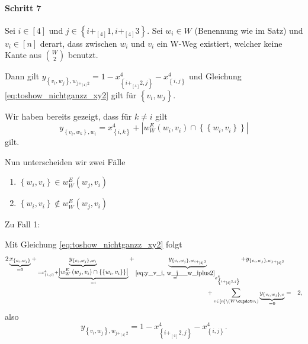 \documentclass[10p,a4paper,BCOR = 12mm, DIV=15]{scrbook}
\begin{document}
{\begin{bew}
\paragraph{Schritt 7} Sei $i \in \left[4\right]$ und $j \in \left\{i +_{\left[4\right]} 1, i +_{\left[4\right]} 3\right\}$. Sei $w_i \in W$ (Benennung wie im Satz) und $v_i \in \left[n\right]$ derart, dass zwischen $w_i$ und $v_i$ ein W-Weg existiert, welcher keine Kante aus ${W \choose 2}$ benutzt.

Dann gilt $y_{\left\{v_i, w_j\right\}, w_{j +_{\left[4\right]} 2}} = 1 - x^{4}_{\left\{i+_{\left[4\right]} 2, j\right\}} - x^{4}_{\left\{i, j\right\}}$ und Gleichung \eqref{eq:toshow_nichtganzz_xy2} gilt für $\left\{v_i, w_j\right\}$.

Wir haben bereits gezeigt, dass für $k \neq i$ gilt
\begin{displaymath}
y_{\left\{v_i, w_k\right\}, w_i} = x^{4}_{\left\{i, k\right\}} + \left|w_W^E\left(w_i, v_i\right) \cap \left\{\left\{w_i, v_i\right\}\right\}\right|
\end{displaymath}
gilt.

Nun unterscheiden wir zwei Fälle
\begin{enumerate}
\item $\left\{w_i, v_i\right\} \in w_W^E\left(w_j, v_i\right)$
\item $\left\{w_i, v_i\right\} \notin w_W^E\left(w_j, v_i\right)$
\end{enumerate}

Zu Fall 1:

Mit Gleichung \eqref{eq:toshow_nichtganzz_xy2} folgt
\begin{eqnarray*}
2 \underbrace{x_{\left\{v_i, w_j\right\}}}_{= 0} + \underbrace{y_{\left\{v_i, w_j\right\}, w_i}}_{= x^{4}_{\left\{i, j\right\}} + \underbrace{\left|w_W^E\left(w_j, v_i\right) \cap \left\{\left\{w_i, v_i\right\}\right\}\right|}_{=1}} + \underbrace{y_{\left\{v_i, w_j\right\}, w_{i +_{\left[4\right]} 2}}}_{\stackrel{\eqref{eq:y_v_i, w_j__w_iplus2}}{=} x^{4}_{\left\{i+_{\left[4\right]} 2, j\right\}}} + y_{\left\{v_i, w_j\right\}, w_{j +_{\left[4\right]} 2}} & & \\
+ \sum_{v \in \left[n\right] \backslash \left(W \cupdot v_i\right)} \underbrace{y_{\left\{v_i, w_j\right\}, v}}_{= 0} & = & 2,
\end{eqnarray*}
also
\begin{displaymath}
y_{\left\{v_i, w_j\right\}, w_{j +_{\left[4\right]} 2}} = 1 - x^{4}_{\left\{i+_{\left[4\right]} 2, j\right\}} - x^{4}_{\left\{i, j\right\}}.
\end{displaymath}


\end{bew}}
\end{document}
